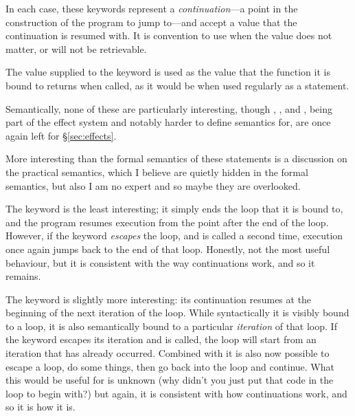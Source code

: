In each case, these keywords represent a \emph{continuation}---a point in the
construction of the program to jump to---and accept a value that the continuation is
resumed with. It is convention to use  when the value does not matter, or will
not be retrievable.

The value supplied to the  keyword is used as the value that the function
it is bound to returns when called, as it would be when used regularly as a statement.

Semantically, none of these are particularly interesting, though , ,
and , being part of the effect system and notably harder to define semantics for,
are once again left for \S\ref{sec:effects}.

\begin{prooftree}
\end{prooftree}

\begin{prooftree}
\end{prooftree}

\begin{prooftree}
\end{prooftree}

More interesting than the formal semantics of these statements is a discussion on
the practical semantics, which I believe are quietly hidden in the formal semantics,
but also I am no expert and so maybe they are overlooked.

The  keyword is the least interesting; it simply ends the loop that it
is bound to, and the program resumes execution from the point after the end of the
loop. However, if the  keyword \emph{escapes} the loop, and is called
a second time, execution once again jumps back to the end of that loop. Honestly, not
the most useful behaviour, but it is consistent with the way continuations work, and
so it remains.

The  keyword is slightly more interesting: its continuation resumes
at the beginning of the next iteration of the loop. While syntactically it is visibly
bound to a loop, it is also semantically bound to a particular \emph{iteration} of
that loop. If the  keyword escapes its iteration and is called,
the loop will start from an iteration that has already occurred. Combined with
 it is also now possible to escape a loop, do some things, then go back
into the loop and continue. What this would be useful for is unknown (why didn't
you just put that code in the loop to begin with?) but again, it is consistent with
how continuations work, and so it is how it is.


